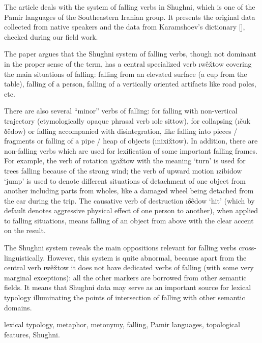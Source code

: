 \vfill

\begin{eng-abstract}
The article deals with the system of falling verbs in Shughni, which is one of the Pamir languages of the Southeastern Iranian group. It presents the original data collected from native speakers and the data from Karamshoev’s dictionary [\cite*{karamshoev1988}], checked during our field work.

The paper argues that the Shughni system of falling verbs, though not dominant in the proper sense of the term, has a central specialized verb \i{wêx̌tow} covering the main situations of falling: falling from an elevated surface (a cup from the table), falling of a person, falling of a vertically oriented artifacts like road poles, etc.

There are also several “minor” verbs of falling: for falling with non-vertical trajectory (etymologically opaque phrasal verb \i{ole sittow}), for collapsing (\i{čuk δêdow}) or falling accompanied with disintegration, like falling into pieces / fragments or falling of a pipe / heap of objects (\i{nixix̌tow}). In addition, there are non-falling verbs which are used for lexification of some important falling frames. For example, the verb of rotation \i{gāx̌tow} with the meaning ‘turn’ is used for trees falling because of the strong wind; the verb of upward motion \i{zibidow} ‘jump’ is used to denote different situations of detachment of one object from another including parts from wholes, like a damaged wheel being detached from the car during the trip. The causative verb of destruction \i{δêdow} ‘hit’ (which by default denotes aggressive physical effect of one person to another), when applied to falling situations, means falling of an object from above with the clear accent on the result.

The Shughni system reveals the main oppositions relevant for falling verbs cross-linguistically. However, this system is quite abnormal, because apart from the central verb \i{wêx̌tow} it does not have dedicated verbs of falling (with some very marginal exceptions): all the other markers are borrowed from other semantic fields. It means that Shughni data may serve as an important source for lexical typology illuminating the points of intersection of {\sc falling} with other semantic domains.
\end{eng-abstract}

\begin{eng-keywords}
lexical typology, metaphor, metonymy, falling, Pamir languages, topological features, Shughni.
\end{eng-keywords}


